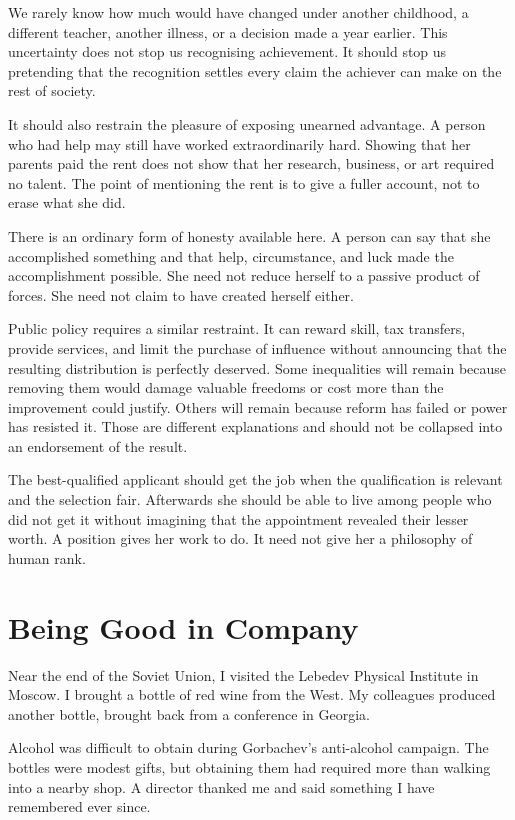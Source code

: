 \documentclass[12pt,a4paper]{book}
\begin{document}
We rarely know how much would have changed under another childhood, a different teacher, another illness, or a decision made a year earlier. This uncertainty does not stop us recognising achievement. It should stop us pretending that the recognition settles every claim the achiever can make on the rest of society.

It should also restrain the pleasure of exposing unearned advantage. A person who had help may still have worked extraordinarily hard. Showing that her parents paid the rent does not show that her research, business, or art required no talent. The point of mentioning the rent is to give a fuller account, not to erase what she did.

There is an ordinary form of honesty available here. A person can say that she accomplished something and that help, circumstance, and luck made the accomplishment possible. She need not reduce herself to a passive product of forces. She need not claim to have created herself either.

Public policy requires a similar restraint. It can reward skill, tax transfers, provide services, and limit the purchase of influence without announcing that the resulting distribution is perfectly deserved. Some inequalities will remain because removing them would damage valuable freedoms or cost more than the improvement could justify. Others will remain because reform has failed or power has resisted it. Those are different explanations and should not be collapsed into an endorsement of the result.

The best-qualified applicant should get the job when the qualification is relevant and the selection fair. Afterwards she should be able to live among people who did not get it without imagining that the appointment revealed their lesser worth. A position gives her work to do. It need not give her a philosophy of human rank.

\chapter{Being Good in Company}

Near the end of the Soviet Union, I visited the Lebedev Physical Institute in Moscow. I brought a bottle of red wine from the West. My colleagues produced another bottle, brought back from a conference in Georgia.

Alcohol was difficult to obtain during Gorbachev's anti-alcohol campaign. The bottles were modest gifts, but obtaining them had required more than walking into a nearby shop. A director thanked me and said something I have remembered ever since.
\end{document}
